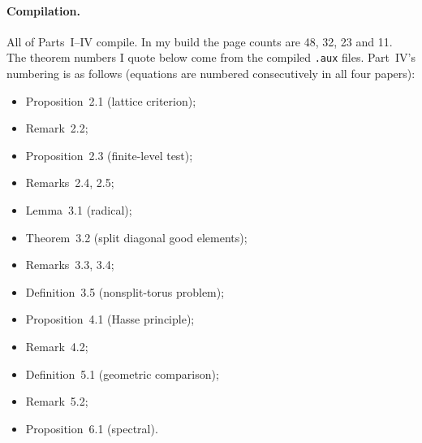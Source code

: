 \documentclass[11pt]{article}
\theoremstyle{definition}
\begin{document}
\paragraph{Compilation.} All of Parts~I--IV compile. In my build the page
counts are 48, 32, 23 and 11. The theorem numbers I quote below come
from the compiled \texttt{.aux} files. Part~IV's numbering is as follows (equations are numbered consecutively in all four papers):
\begin{itemize}
\item Proposition~2.1 (lattice criterion);
\item Remark~2.2;
\item Proposition~2.3 (finite-level test);
\item Remarks~2.4, 2.5;
\item Lemma~3.1 (radical);
\item Theorem~3.2 (split diagonal good elements);
\item Remarks~3.3, 3.4;
\item Definition~3.5 (nonsplit-torus problem);
\item Proposition~4.1 (Hasse principle);
\item Remark~4.2;
\item Definition~5.1 (geometric comparison);
\item Remark~5.2;
\item Proposition~6.1 (spectral).
\end{itemize}
\end{document}
